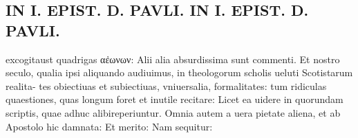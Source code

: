 \documentclass{article}
\begin{document}
\begin{pages}
\section*{IN I. EPIST. D. PAVLI. IN I. EPIST. D. PAVLI. }
\marginpar{[ p.122 ]}\pstart excogitaust quadrigas αἐωνων: Alii alia absurdissima sunt commenti. Et nostro seculo, qualia ipsi aliquando audiuimus, in theologorum scholis ueluti Scotistarum realita- tes obiectiuas et subiectiuas, vniuersalia, formalitates: tum ridiculas quaestiones, quas longum foret et inutile recitare: Licet ea uidere in quorundam scriptis, quae adhuc alibireperiuntur. Omnia autem a uera pietate aliena, et ab Apostolo hic damnata: Et merito: Nam sequitur:  \pend
{}
{}

\end{pages}
\end{document}
